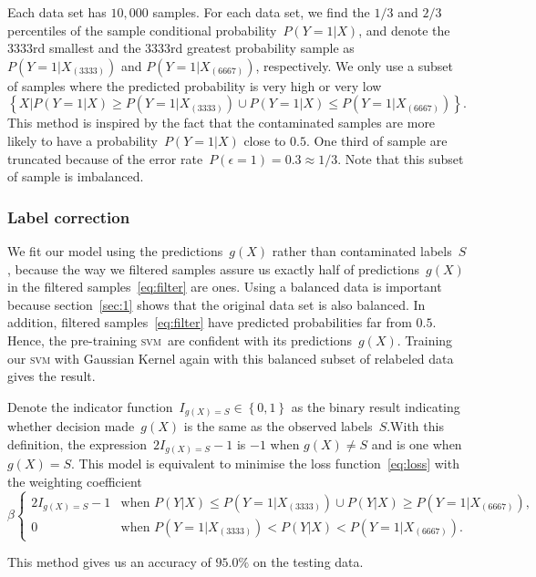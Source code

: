 \documentclass[12pt]{article} %
\newcommand{\svm}{\textsc{svm}}
\begin{document}
Each data set has $10,000$ samples.
For each data set, we find the $1/3$ and $2/3$ percentiles of the sample conditional probability~$P(Y=1|X)$, and denote the $3333$rd smallest and the $3333$rd greatest probability sample as $P(Y=1|X_{(3333)})$ and $P(Y=1|X_{(6667)})$, respectively. 
We only use a subset of samples where the predicted probability is very high or very low 
\begin{equation}\label{eq:filter}
\left\{X|P(Y=1|X)\geq P(Y=1|X_{(3333)}) \cup P(Y=1|X)\leq P(Y=1|X_{(6667)}) \right\}.
\end{equation}
This method is inspired by the fact that the contaminated samples are more likely to have a probability~$P(Y=1|X)$ close to $0.5$. One third of sample are truncated because of the error rate~$P(\epsilon=1)=0.3\approx 1/3$. Note that this subset of sample is imbalanced.

\subsubsection{Label correction}
We fit our model using the predictions~$g(X)$ rather than contaminated labels~$S$, because the way we filtered samples  assure us exactly half of predictions~$g(X)$ in the filtered samples~\eqref{eq:filter}  are ones. 
Using a balanced data is important because section~\ref{sec:1} shows that the original data set is also balanced. In addition, filtered samples~\eqref{eq:filter} have  predicted probabilities far from $0.5$. Hence, the pre-training \svm\ are confident with its predictions~$g(X)$.
Training our \textsc{svm} with Gaussian Kernel again with this balanced subset of relabeled data gives the result.

Denote the indicator function~$I_{g(X)=S} \in \left\{0,1\right\}$ as the binary result indicating whether decision made~$g(X)$ is the same as the observed labels~$S$.With this definition, the expression~$2I_{g(X)=S}-1$ is $-1$ when $g(X)\neq S$ and is one when $g(X)=S$.  This model is equivalent to minimise the loss function~\eqref{eq:loss} with the weighting coefficient
\begin{equation*}
\beta\begin{cases}
2I_{g(X)=S}-1 & \text{when }P({Y}|X)\leq P(Y=1|X_{(3333)}) \cup P({Y}|X)\geq P(Y=1|X_{(6667)}),\\
0 & \text{when }P(Y=1|X_{(3333)})<P({Y}|X)<P(Y=1|X_{(6667)}).
\end{cases}
\end{equation*}


This method gives us an accuracy of $95.0\%$ on the testing data.
\end{document}
